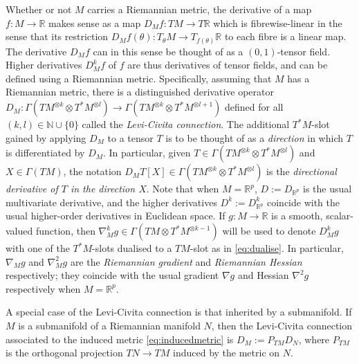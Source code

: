 \documentclass{article}
\newcommand{\RB}{\mathbb{R}}
\newcommand{\NB}{\mathbb{N}}
\theoremstyle{plain}
\theoremstyle{definition}
\theoremstyle{remark}
\begin{document}
Whether or not $M$ carries a Riemannian metric, the derivative of a map $f:M\rightarrow\RB$ makes sense as a map $D_Mf:TM\rightarrow T\RB$ which is fibrewise-linear in the sense that its restriction $D_Mf(\theta):T_{\theta}M\rightarrow T_{f(\theta)}\RB$ to each fibre is a linear map. The derivative $D_Mf$ can in this sense be thought of as a $(0,1)$-tensor field. Higher derivatives $D^k_Mf$ of $f$ are thus derivatives of tensor fields, and can be defined using a Riemannian metric. Specifically, assuming that $M$ has a Riemannian metric, there is a distinguished derivative operator $D_M:\Gamma(TM^{\otimes k}\otimes T^*M^{\otimes l})\rightarrow\Gamma(TM^{\otimes k}\otimes T^*M^{\otimes l+1})$ defined for all $(k,l)\in\NB\cup\{0\}$ called the \emph{Levi-Civita connection}. The additional $T^*M$-slot gained by applying $D_M$ to a tensor $T$ is to be thought of as a \emph{direction} in which $T$ is differentiated by $D_M$. In particular, given $T\in\Gamma(TM^{\otimes k}\otimes T^*M^{\otimes l})$ and $X\in\Gamma(TM)$, the notation $D_MT[X]\in\Gamma(TM^{\otimes k}\otimes T^*M^{\otimes l})$ is the \emph{directional derivative of $T$ in the direction $X$}. Note that when $M = \RB^p$, $D:=D_{\RB^p}$ is the usual multivariate derivative, and the higher derivatives $D^k:=D^k_{\RB^p}$ coincide with the usual higher-order derivatives in Euclidean space. If $g:M\rightarrow\RB$ is a smooth, scalar-valued function, then $\nabla^k_Mg\in\Gamma(TM\otimes T^*M^{\otimes k-1})$ will be used to denote $D^k_Mg$ with one of the $T^*M$-slots dualised to a $TM$-slot as in \eqref{eq:dualise}. In particular, $\nabla_Mg$ and $\nabla_M^2g$ are the \emph{Riemannian gradient} and \emph{Riemannian Hessian} respectively; they coincide with the usual gradient $\nabla g$ and Hessian $\nabla^2g$ respectively when $M = \RB^p$.

A special case of the Levi-Civita connection is that inherited by a submanifold. If $M$ is a submanifold of a Riemannian manifold $N$, then the Levi-Civita connection associated to the induced metric \eqref{eq:inducedmetric} is $D_M:=P_{TM}D_N$, where $P_{TM}$ is the orthogonal projection $TN\rightarrow TM$ induced by the metric on $N$.
\end{document}
